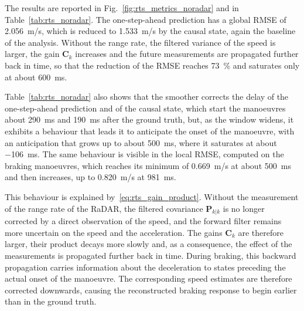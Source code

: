 The results are reported in Fig.~\ref{fig:rts_metrics_noradar} and in
Table~\ref{tab:rts_noradar}. The one-step-ahead prediction has a global RMSE of
\SI{2.056}{m/s}, which is reduced to \SI{1.533}{m/s} by the causal state, again the baseline
of the analysis. Without the range rate, the filtered variance of the speed is larger, the
gain $\mathbf{C}_k$ increases and the future measurements are propagated further back in
time, so that the reduction of the RMSE reaches \SI{73}{\percent} and saturates only at about
\SI{600}{ms}.

Table~\ref{tab:rts_noradar} also shows that the smoother corrects the delay of the
one-step-ahead prediction and of the causal state, which start the manoeuvres about
\SI{290}{ms} and \SI{190}{ms} after the ground truth, but, as the window widens, it exhibits a
behaviour that leads it to anticipate the onset of the manoeuvre, with an anticipation that grows
up to about \SI{500}{ms}, where it saturates at about \SI{-106}{ms}. The same behaviour is visible in the
local RMSE, computed on the braking manoeuvres, which reaches its minimum of \SI{0.669}{m/s} at
about \SI{500}{ms} and then increases, up to \SI{0.820}{m/s} at \SI{981}{ms}.

This behaviour is explained by~\eqref{eq:rts_gain_product}. Without the measurement of the
range rate of the RaDAR, the filtered covariance $\mathbf{P}_{k|k}$ is no longer corrected by
a direct observation of the speed, and the forward filter remains more uncertain on the speed and
the acceleration. The gains $\mathbf{C}_k$ are therefore larger, their product decays more
slowly and, as a consequence, the effect of the measurements is propagated further back in
time. During braking, this backward propagation carries information about the deceleration to
states preceding the actual onset of the manoeuvre. The corresponding speed estimates are
therefore corrected downwards, causing the reconstructed braking response to begin earlier
than in the ground truth.

